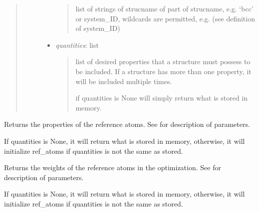 \documentclass[letterpaper,10pt,english]{sphinxmanual}
\begin{document}
\begin{fulllineitems}
\begin{fulllineitems}
\begin{quote}
\begin{description}
\begin{itemize}
\begin{quote}
list of strings of strucname of part of strucname, e.g. `bcc' 
or system\_ID, wildcards are permitted, e.g. 
(see definition of system\_ID)
\end{quote}

\item {} 
\emph{quantities}: list
\begin{quote}

list of desired properties that a structure must possess to be 
included. If a structure has more than one property, it will
be included multiple times.

if quantities is None will simply return what is stored in 
memory.
\end{quote}

\end{itemize}

\end{description}\end{quote}

\end{fulllineitems}


\begin{fulllineitems}
\label{classes:catdata.CATData.get_ref_data}
Returns the properties of the reference atoms. 
See {\hyperref[classes:catdata.CATData.get_ref_atoms]{}} for description of parameters.

If quantities is None, it will return what is stored in memory,
otherwise, it will initialize ref\_atoms if quantities is not
the same as stored.

\end{fulllineitems}


\begin{fulllineitems}
\label{classes:catdata.CATData.get_ref_weights}
Returns the weights of the reference atoms in the optimization. 
See {\hyperref[classes:catdata.CATData.get_ref_atoms]{}} for description of parameters.

If quantities is None, it will return what is stored in memory,
otherwise, it will initialize ref\_atoms if quantities is not
the same as stored.


\end{fulllineitems}
\end{fulllineitems}
\end{document}
